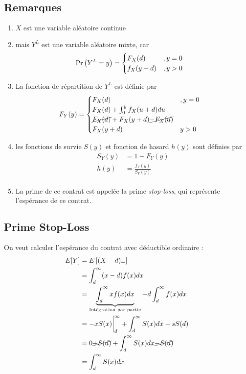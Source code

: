 \documentclass[12pt, french]{report}
\begin{document}
\subsection{Remarques}

\begin{enumerate}[label=(\arabic*)]
\item $X$ est une variable aléatoire continue

\item mais $Y^L$ est une variable aléatoire mixte, car
\begin{align*}
\Pr \left( Y^L = y \right) & = 
\begin{cases}
F_X(d)	& ,y = 0 \\
f_X(y+d)	& , y > 0 \\
\end{cases}
\end{align*}


\item La fonction de répartition de $Y^L$ est définie par
\begin{align*}
F_Y(y)	& = 
\begin{cases}
F_X(d)	& , y = 0 \\
F_X(d) + \int_{0}^{y} f_X(u+d) du \\
\cancel{F_X(d)} + F_X(y+d) \cancel{- F_X(d)} \\
F_X(y + d)	& y > 0 \\
\end{cases}
\end{align*}
\item les fonctions de survie $S(y)$ et fonction de hasard $h(y)$ sont définies par
\begin{align*}
S_Y(y) 	& = 1 - F_Y(y) \\
h(y)		& = \frac{f_Y(y)}{S_Y(y)} \\
\end{align*}

\item La prime de ce contrat est appelée la prime \textit{stop-loss}, qui représente l'espérance de ce contrat.
\end{enumerate}

\subsection{Prime Stop-Loss}
On veut calculer l'espérance du contrat avec déductible ordinaire : 
\begin{align*}
E[Y]		& = E \left[ (X-d)_+ \right] \\
	& = \int_{d}^{\infty} (x-d) f(x) dx \\
	& = \underbrace{\int_{d}^{\infty} x f(x) dx}_{\text{Intégration par partie}} - d \int_{d}^{\infty} f(x) dx \\
	& = -x S(x) \biggr \rvert_d^\infty + \int_{d}^{\infty} S(x) dx  - s S(d) \\
	& = 0  \cancel{+ S(d)} +  \int_{d}^{\infty} S(x) dx  \cancel{- S(d)} \\
	& = \int_{d}^{\infty} S(x) dx \\
\end{align*}
\end{document}
